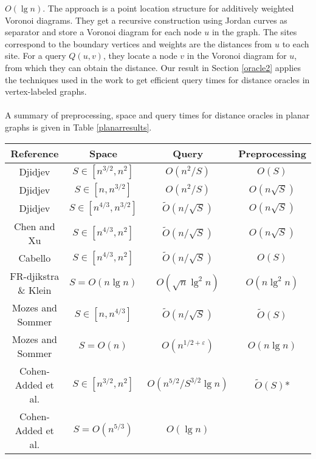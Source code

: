 $O(\lg n)$. The approach is a point location structure for additively weighted Voronoi
diagrams. They get a recursive construction using Jordan curves as separator and store a
Voronoi diagram for each node $u$ in the graph. The sites correspond to the boundary
vertices and weights are the distances from $u$ to each site. For a query $Q(u,v)$, they
locate a node $v$ in the Voronoi diagram for $u$, from which they can obtain the
distance. Our result in Section \ref{oracle2} applies the techniques used in the work to
get efficient query times for distance oracles in vertex-labeled graphs. \\
\\
A summary of preprocessing, space and query times for distance oracles in planar graphs is given in Table \ref{planarresults}.

\begin{table}[h!]
  \footnotesize
  \centering
  \begin{tabular}{c | c | c | c}
    Reference & Space & Query & Preprocessing \\
    \hline\hline
    Djidjev \cite{djidjev1996efficient} & $S\in [n^{3/2}, n^2]$ & $O(n^2/S)$ & $O(S)$ \\
    \hline
    Djidjev \cite{djidjev1996efficient} & $S\in [n, n^{3/2}]$ & $O(n^2/S)$ & $O(n\sqrt{S})$ \\
    \hline
    Djidjev \cite{djidjev1996efficient} & $S\in [n^{4/3}, n^{3/2}]$ &
    $\tilde{O}(n/\sqrt{S})$ & $O(n\sqrt{S})$ \\
    \hline
    Chen and Xu \cite{chen2000shortest} & $S\in [n^{4/3}, n^2]$ & $\tilde{O}(n/\sqrt{S})$
    & $O(n\sqrt{S})$ \\
    \hline
    Cabello \cite{cabello2006many} & $S\in [n^{4/3}, n^2]$ & $\tilde{O}(n/\sqrt{S})$ &
    $O(S)$ \\
    \hline
    FR-djikstra \& Klein \cite{klein2005multiple}\cite{fakcharoenphol2006planar}& $S = O(n\lg n)$ &
    $O(\sqrt{n}\lg^2 n)$ & $O(n\lg^2 n)$ \\
    \hline
    Mozes and Sommer \cite{mozes2012exact} & $S\in [n, n^{4/3}]$ &
    $\tilde{O}(n/\sqrt{S})$ & $\tilde{O}(S)$ \\
    \hline
    Mozes and Sommer \cite{mozes2012exact} & $S=O(n)$ & $O(n^{1/2+\varepsilon})$ & $O(n\lg
    n)$ \\
    \hline
    Cohen-Added et al. \cite{cohen2017fast} & $S\in [n^{3/2}, n^2]$ &
    $O(n^{5/2}/S^{3/2}\lg n)$ & $\tilde{O}(S)$* \\
    \hline
    Cohen-Added et al. \cite{cohen2017fast} & $S=O(n^{5/3})$ & $O(\lg n)$ &

\end{tabular}
\end{table}
